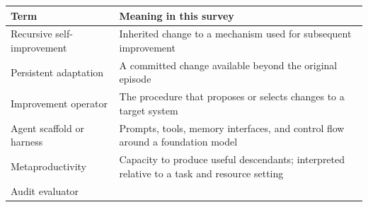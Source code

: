 \documentclass[11pt,american,]{article}
\begin{document}
\begin{longtable}[]{@{}ll@{}}
\toprule
\begin{minipage}[b]{0.47\columnwidth}\raggedright
Term\strut
\end{minipage} & \begin{minipage}[b]{0.47\columnwidth}\raggedright
Meaning in this survey\strut
\end{minipage}\tabularnewline
\midrule
\endhead
\begin{minipage}[t]{0.47\columnwidth}\raggedright
Recursive self-improvement\strut
\end{minipage} & \begin{minipage}[t]{0.47\columnwidth}\raggedright
Inherited change to a mechanism used for subsequent improvement\strut
\end{minipage}\tabularnewline
\begin{minipage}[t]{0.47\columnwidth}\raggedright
Persistent adaptation\strut
\end{minipage} & \begin{minipage}[t]{0.47\columnwidth}\raggedright
A committed change available beyond the original episode\strut
\end{minipage}\tabularnewline
\begin{minipage}[t]{0.47\columnwidth}\raggedright
Improvement operator\strut
\end{minipage} & \begin{minipage}[t]{0.47\columnwidth}\raggedright
The procedure that proposes or selects changes to a target system\strut
\end{minipage}\tabularnewline
\begin{minipage}[t]{0.47\columnwidth}\raggedright
Agent scaffold or harness\strut
\end{minipage} & \begin{minipage}[t]{0.47\columnwidth}\raggedright
Prompts, tools, memory interfaces, and control flow around a foundation
model\strut
\end{minipage}\tabularnewline
\begin{minipage}[t]{0.47\columnwidth}\raggedright
Metaproductivity\strut
\end{minipage} & \begin{minipage}[t]{0.47\columnwidth}\raggedright
Capacity to produce useful descendants; interpreted relative to a task
and resource setting\strut
\end{minipage}\tabularnewline
\begin{minipage}[t]{0.47\columnwidth}\raggedright
Audit evaluator\strut

\end{minipage}
\end{longtable}
\end{document}

